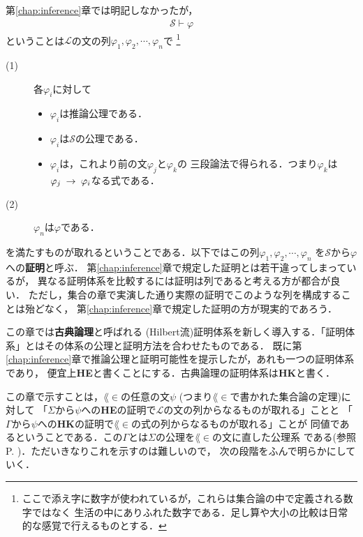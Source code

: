 	第\ref{chap:inference}章では明記しなかったが，
	\begin{align}
		\mathscr{S} \vdash \varphi
	\end{align}
	ということは$\mathcal{L}$の文の列$\varphi_{1},\varphi_{2},\cdots,\varphi_{n}$で
	\footnote{
		ここで添え字に数字が使われているが，これらは集合論の中で定義される数字ではなく
		生活の中にありふれた数字である．足し算や大小の比較は日常的な感覚で行えるものとする．
	}
	\begin{description}
		\item[(1)] 各$\varphi_{i}$に対して
			\begin{itemize}
				\item $\varphi_{i}$は推論公理である．
				\item $\varphi_{i}$は$\mathscr{S}$の公理である．
				\item $\varphi_{i}$は，これより前の文$\varphi_{j}$と$\varphi_{k}$の
					三段論法で得られる．つまり$\varphi_{k}$は
					$\varphi_{j} \hspace{0.25em}\rightarrow\hspace{0.25em} \varphi_{i}$なる式である．
			\end{itemize}
		
		\item[(2)] $\varphi_{n}$は$\varphi$である．
	\end{description}
	を満たすものが取れるということである．以下ではこの列$\varphi_{1},\varphi_{2},\cdots,\varphi_{n}$
	を$\mathscr{S}$から$\varphi$への{\bf 証明}と呼ぶ．
	第\ref{chap:inference}章で規定した証明とは若干違ってしまっているが，
	異なる証明体系を比較するには証明は列であると考える方が都合が良い．
	ただし，集合の章で実演した通り実際の証明でこのような列を構成することは殆どなく，
	第\ref{chap:inference}章で規定した証明の方が現実的であろう．
	
	この章では{\bf 古典論理}と呼ばれる
	(Hilbert流)証明体系を新しく導入する．「証明体系」とはその体系の公理と証明方法を合わせたものである．
	既に第\ref{chap:inference}章で推論公理と証明可能性を提示したが，あれも一つの証明体系であり，
	便宜上{\bf HE}と書くことにする．古典論理の証明体系は{\bf HK}と書く．
	
	この章で示すことは，$\lang{\in}$の任意の文$\psi$
	(つまり$\lang{\in}$で書かれた集合論の定理)に対して
	「$\Sigma$から$\psi$への{\bf HE}の証明で$\mathcal{L}$の文の列からなるものが取れる」ことと
	「$\Gamma$から$\psi$への{\bf HK}の証明で$\lang{\in}$の式の列からなるものが取れる」ことが
	同値であるということである．この$\Gamma$とは$\Sigma$の公理を$\lang{\in}$の文に直した公理系
	である(参照P. \pageref{axioms_of_Gamma})．ただいきなりこれを示すのは難しいので，
	次の段階をふんで明らかにしていく．
	
